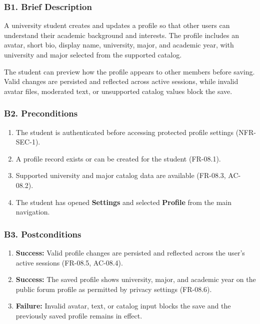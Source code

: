 \documentclass[12pt]{article}
\begin{document}
\hypertarget{sec:b1-brief-description}{}
\subsubsection*{B1. Brief Description}
\par\medskip

A university student creates and updates a profile so that other users can understand their academic background and interests. The profile includes an avatar, short bio, display name, university, major, and academic year, with university and major selected from the supported catalog.
\par\medskip

The student can preview how the profile appears to other members before saving. Valid changes are persisted and reflected across active sessions, while invalid avatar files, moderated text, or unsupported catalog values block the save.
\par\medskip

\hypertarget{sec:b2-preconditions}{}
\subsubsection*{B2. Preconditions}
\par\medskip

\begin{enumerate}
\item The student is authenticated before accessing protected profile settings (NFR-SEC-1).
\item A profile record exists or can be created for the student (FR-08.1).
\item Supported university and major catalog data are available (FR-08.3, AC-08.2).
\item The student has opened \textbf{Settings} and selected \textbf{Profile} from the main navigation.
\end{enumerate}
\par\medskip

\hypertarget{sec:b3-postconditions}{}
\subsubsection*{B3. Postconditions}
\par\medskip

\begin{enumerate}
\item \textbf{Success:} Valid profile changes are persisted and reflected across the user's active sessions (FR-08.5, AC-08.4).
\item \textbf{Success:} The saved profile shows university, major, and academic year on the public forum profile as permitted by privacy settings (FR-08.6).
\item \textbf{Failure:} Invalid avatar, text, or catalog input blocks the save and the previously saved profile remains in effect.
\end{enumerate}
\par\medskip
\end{document}
